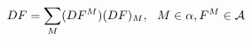 \begin{equation}\label{DERI}
  DF =   \sum_M (DF^M) (DF)_M, ~~ M \in \alpha, F^M \in {\cal A}
\end{equation}

